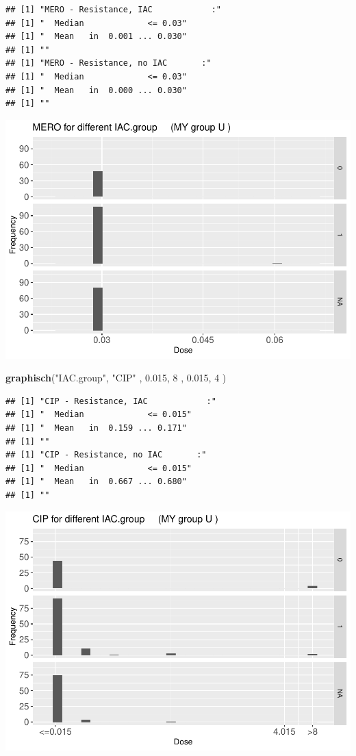 \documentclass[
]{article}
\newenvironment{Shaded}{\begin{snugshade}}{\end{snugshade}}
\newcommand{\DecValTok}[1]{\textcolor[rgb]{0.00,0.00,0.81}{#1}}
\newcommand{\FloatTok}[1]{\textcolor[rgb]{0.00,0.00,0.81}{#1}}
\newcommand{\KeywordTok}[1]{\textcolor[rgb]{0.13,0.29,0.53}{\textbf{#1}}}
\newcommand{\NormalTok}[1]{#1}
\newcommand{\StringTok}[1]{\textcolor[rgb]{0.31,0.60,0.02}{#1}}
\begin{document}
\begin{verbatim}
## [1] "MERO - Resistance, IAC            :"
## [1] "  Median             <= 0.03"
## [1] "  Mean   in  0.001 ... 0.030"
## [1] ""
## [1] "MERO - Resistance, no IAC       :"
## [1] "  Median             <= 0.03"
## [1] "  Mean   in  0.000 ... 0.030"
## [1] ""
\end{verbatim}

\includegraphics{Verteilungen_files/figure-latex/unnamed-chunk-6-1.pdf}

\begin{Shaded}
\begin{Highlighting}[]
  \KeywordTok{graphisch}\NormalTok{(}\StringTok{"IAC.group"}\NormalTok{, }\StringTok{"CIP"}\NormalTok{ , }\FloatTok{0.015}\NormalTok{,   }\DecValTok{8}\NormalTok{   ,   }\FloatTok{0.015}\NormalTok{,   }\DecValTok{4}\NormalTok{     ) }
\end{Highlighting}
\end{Shaded}

\begin{verbatim}
## [1] "CIP - Resistance, IAC            :"
## [1] "  Median             <= 0.015"
## [1] "  Mean   in  0.159 ... 0.171"
## [1] ""
## [1] "CIP - Resistance, no IAC       :"
## [1] "  Median             <= 0.015"
## [1] "  Mean   in  0.667 ... 0.680"
## [1] ""
\end{verbatim}

\includegraphics{Verteilungen_files/figure-latex/unnamed-chunk-7-1.pdf}
\end{document}
